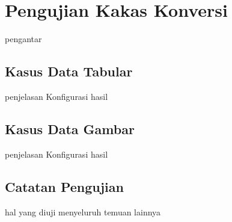 \section{Pengujian Kakas Konversi}

pengantar

\subsection{Kasus Data Tabular}

penjelasan
Konfigurasi
hasil

\subsection{Kasus Data Gambar}

penjelasan
Konfigurasi
hasil

\subsection{Catatan Pengujian}

hal yang diuji menyeluruh
temuan lainnya
